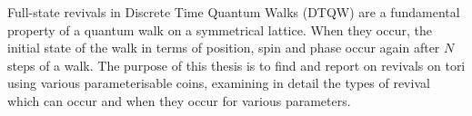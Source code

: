 Full-state revivals in Discrete Time Quantum Walks (DTQW) are a fundamental property of a quantum walk on a symmetrical lattice. 
When they occur, the initial state of the walk in terms of position, spin and phase occur again after $N$ steps of a walk.
The purpose of this thesis is to find and report on revivals on tori using various parameterisable coins, examining
in detail the types of revival which can occur and when they occur for various parameters.
